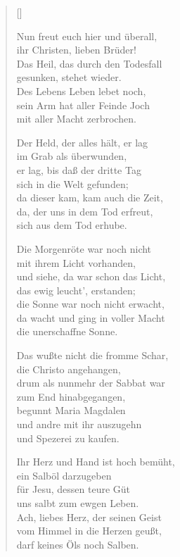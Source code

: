 \begin{multicols}{2}
\settowidth{\versewidth}{der sprach: Habt Freud und Trost und seid}
\begin{verse}[\versewidth]

 Nun freut euch hier und überall,\\
ihr Christen, lieben Brüder!\\
Das Heil, das durch den Todesfall\\
gesunken, stehet wieder.\\
Des Lebens Leben lebet noch,\\
sein Arm hat aller Feinde Joch\\
mit aller Macht zerbrochen.

 Der Held, der alles hält, er lag\\
im Grab als überwunden,\\
er lag, bis daß der dritte Tag\\
sich in die Welt gefunden;\\
da dieser kam, kam auch die Zeit,\\
da, der uns in dem Tod erfreut,\\
sich aus dem Tod erhube.

 Die Morgenröte war noch nicht\\
mit ihrem Licht vorhanden,\\
und siehe, da war schon das Licht,\\
das ewig leucht', erstanden;\\
die Sonne war noch nicht erwacht,\\
da wacht und ging in voller Macht\\
die unerschaffne Sonne.

 Das wußte nicht die fromme Schar,\\
die Christo angehangen,\\
drum als nunmehr der Sabbat war\\
zum End hinabgegangen,\\
begunnt Maria Magdalen\\
und andre mit ihr auszugehn\\
und Spezerei zu kaufen.

 Ihr Herz und Hand ist hoch bemüht,\\
ein Salböl darzugeben\\
für Jesu, dessen teure Güt\\
uns salbt zum ewgen Leben.\\
Ach, liebes Herz, der seinen Geist\\
vom Himmel in die Herzen geußt,\\
darf keines Öls noch Salben.


\end{verse}
\end{multicols}
